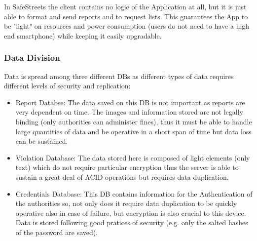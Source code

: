 In SafeStreets the client contains no logic of the 
Application at all, but it is just able to format 
and send reports and to request lists.
This guarantees the App to be "light" on resources 
and power consumption (users do not need to 
have a high end smartphone) while keeping it easily 
upgradable.

\subsubsection{Data Division}

Data is spread among three different DBs as 
different types of data requires different levels 
of security and replication:

\begin{itemize}

    \item  Report Databse: The data saved on this 
    DB is not important as reports are very dependent 
    on time. The images and information stored are not 
    legally binding (only authorities can administer 
    fines), thus it must be able to handle large 
    quantities of data and be operative in a short 
    span of time but data loss can be sustained.

    \item Violation Database: The data stored here 
    is composed of light elements (only text) 
    which do not require particular encryption 
    thus the server is able to sustain a great 
    deal of ACID operations but requires data 
    duplication.

    \item Credentials Database: This DB contains 
    information for the Authentication of the 
    authorities so, not only does it require data 
    duplication to be quickly operative also in 
    case of failure, but encryption is also 
    crucial to this device. Data is stored 
    following good pratices of security (e.g. 
    only the salted hashes of the password are 
    saved).     

\end{itemize}